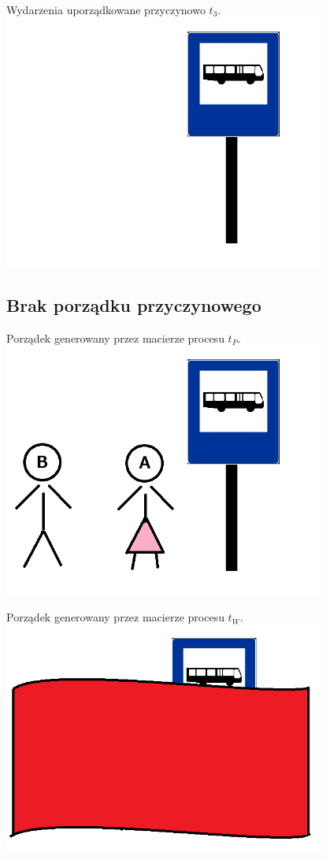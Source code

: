 \documentclass{beamer}
\begin{document}
\begin{frame}{Wydarzenia uporządkowane przyczynowo $t_3$.}
\centering
\includegraphics[width=0.8\textwidth]{obrazki/p}
\end{frame}

\subsection{Brak porządku przyczynowego}

\begin{frame}{Porządek generowany przez macierze procesu $t_P$.}
\centering
\includegraphics[width=0.8\textwidth]{obrazki/pAB}
\end{frame}

\begin{frame}{Porządek generowany przez macierze procesu $t_W$.}
\centering
\includegraphics[width=0.8\textwidth]{obrazki/pW}
\end{frame}
\end{document}
